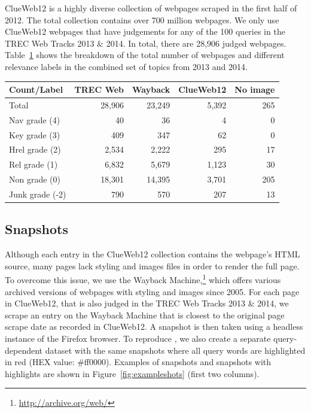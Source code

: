 ClueWeb12 is a highly diverse collection of webpages scraped in the first half of 2012.
The total collection contains over 700 million webpages.
%
We only use ClueWeb12 webpages that have judgements for any of the 100 queries in the TREC Web Tracks 2013 \& 2014.
In total, there are 28,906 judged webpages.
%
Table~\ref{tab:countsources} shows the breakdown of the total number of webpages and different relevance labels in the combined set of topics from 2013 and 2014.

\begin{table}[h]
  \label{tab:countsources}
  \begin{tabular}{ l  @{}r  r  r  r }
  \toprule
    Count/Label & TREC Web & Wayback & ClueWeb12 & \mbox{}\hspace*{-.15cm}No image\\
    \midrule
    Total & 28,906 & 23,249 & 5,392 & 265 \\
    Nav grade (4) & 40 & 36 & 4 & 0\\
    Key grade (3) & 409 & 347 & 62 & 0\\
    Hrel grade (2) & 2,534 & 2,222 & 295 & 17 \\
    Rel grade (1) & 6,832 & 5,679 & 1,123 & 30\\
    Non grade (0) & 18,301 & 14,395 & 3,701 & 205 \\
    Junk grade (-2) & 790 & 570 & 207 & 13\\
    \bottomrule
  \end{tabular} 
\end{table}


\subsection{Snapshots} \label{sec:screenshotsec}
Although each entry in the ClueWeb12 collection contains the webpage's HTML source, many pages lack styling and images files in order to render the full page.
To overcome this issue, we use the Wayback Machine,\footnote{\url{http://archive.org/web/}} which offers various archived versions of webpages with styling and images since 2005.
For each page in ClueWeb12, that is also judged in the TREC Web Tracks 2013 \& 2014,
we scrape an entry on the Wayback Machine that is closest to the original page scrape date as recorded in ClueWeb12.
A snapshot is then taken using a headless instance of the Firefox browser.
To reproduce \cite{fan2017learning}, we also create a separate query-dependent dataset with the same snapshots where all query words are highlighted in red (HEX value: \#ff0000).
Examples of snapshots and snapshots with highlights are shown in Figure~\ref{fig:exampleshots} (first two columns). 


